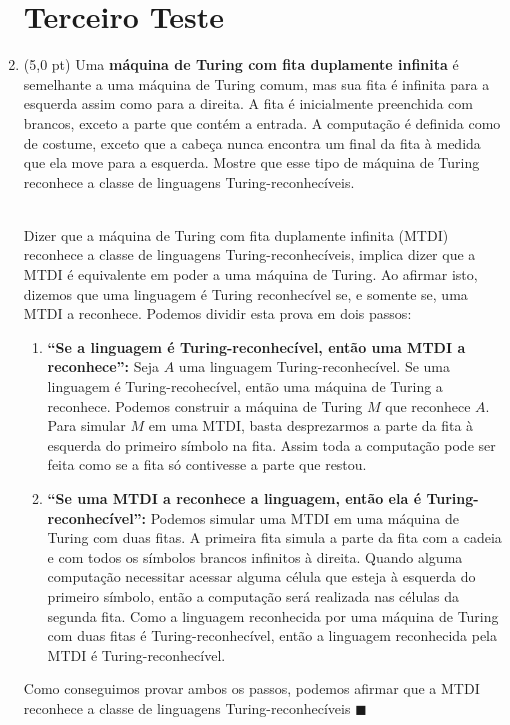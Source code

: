 \documentclass[12pt,a4paper,oneside]{article}
\begin{document}
\begin{enumerate}
	
	\section*{Terceiro Teste}
	
	\item (5,0 pt) Uma {\bf máquina de Turing com fita duplamente infinita} é semelhante a uma máquina de Turing comum, mas sua fita é infinita para a esquerda assim como para a direita. A fita é inicialmente preenchida com brancos, exceto a parte que contém a entrada. A computação é definida como de costume, exceto que a cabeça nunca encontra um final da fita à medida que ela move para a esquerda. Mostre que esse tipo de máquina de Turing reconhece a classe de linguagens Turing-reconhecíveis.\\ \\
	{\color{verde}
		Dizer que a máquina de Turing com fita duplamente infinita (MTDI) reconhece a classe de linguagens Turing-reconhe\-cíveis, implica dizer que a MTDI é equivalente em poder a uma máquina de Turing. Ao afirmar isto, dizemos que uma linguagem é Turing reconhecível se, e somente se, uma MTDI a reconhece. Podemos dividir esta prova em dois passos:
		\begin{enumerate}
			\item {\bf ``Se a linguagem é Turing-reconhecível, então uma MTDI a reconhece'':}	 Seja $A$ uma linguagem Turing-reconhecível. Se uma linguagem é Turing-recohecível, então uma máquina de Turing a reconhece. Podemos construir a máquina de Turing $M$ que reconhece $A$. Para simular $M$ em uma MTDI, basta desprezarmos a parte da fita à esquerda do primeiro símbolo na fita. Assim toda a computação pode ser feita como se a fita só contivesse a parte que restou.
			\item {\bf ``Se uma MTDI a reconhece a linguagem, então ela é Turing-reconhecível'':} Podemos simular uma MTDI em uma máquina de Turing com duas fitas. A primeira fita simula a parte da fita com a cadeia e com todos os símbolos brancos infinitos à direita. Quando alguma computação necessitar acessar alguma célula que esteja à esquerda do primeiro símbolo, então a computação será realizada nas células da segunda fita. Como a linguagem reconhecida por uma máquina de Turing com duas fitas é Turing-reconhecível, então a linguagem reconhecida pela MTDI é Turing-reconhecível.	
		\end{enumerate}
		Como conseguimos provar ambos os passos, podemos afirmar que a MTDI reconhece a classe de linguagens Turing-reconhecíveis $\blacksquare$
	}
	

\end{enumerate}
\end{document}
